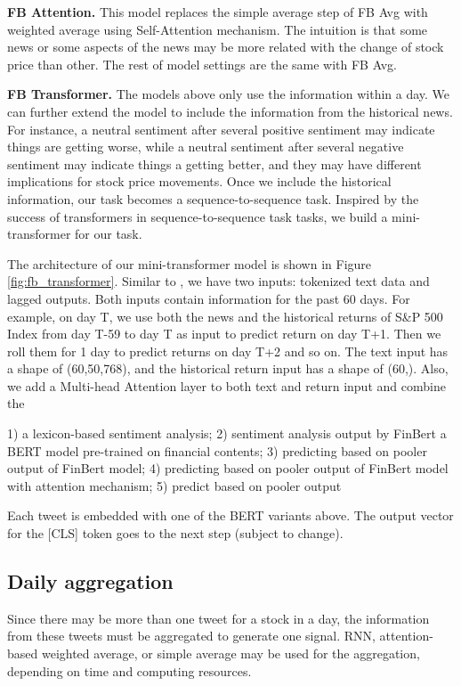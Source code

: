 \documentclass[11pt]{article}
\begin{document}
\textbf{FB Attention.} This model replaces the simple average step of FB Avg with weighted average using Self-Attention mechanism. The intuition is that some news or some aspects of the news may be more related with the change of stock price than other. The rest of model settings are the same with FB Avg.

\textbf{FB Transformer.} The models above only use the information within a day. We can further extend the model to include the information from the historical news. For instance, a neutral sentiment after several positive sentiment may indicate things are getting worse, while a neutral sentiment after several negative sentiment may indicate things a getting better, and they may have different implications for stock price movements. Once we include the historical information, our task becomes a sequence-to-sequence task. Inspired by the success of transformers in sequence-to-sequence task tasks, we build a mini-transformer for our task.

The architecture of our mini-transformer model is shown in Figure \ref{fig:fb_transformer}. Similar to \citet{NIPS2017_3f5ee243}, we have two inputs: tokenized text data and lagged outputs. Both inputs contain information for the past 60 days. For example, on day T, we use both the news and the historical returns of S\&P 500 Index from day T-59 to day T as input to predict return on day T+1. Then we roll them for 1 day to predict returns on day T+2 and so on. The text input has a shape of (60,50,768), and the historical return input has a shape of (60,). Also, we add a Multi-head Attention layer to both text and return input and combine the 









1) a lexicon-based sentiment analysis; 2) sentiment analysis output by FinBert a BERT model pre-trained on financial contents; 3) predicting based on pooler output of FinBert model; 4) predicting based on pooler output of FinBert model with attention mechanism; 5) predict based on pooler output 

Each tweet is embedded with one of the BERT variants above. The output vector for the [CLS] token goes to the next step (subject to change).

\subsection{Daily aggregation}
Since there may be more than one tweet for a stock in a day, the information from these tweets must be aggregated to generate one signal. RNN, attention-based weighted average, or simple average may be used for the aggregation, depending on time and computing resources. 
\end{document}
